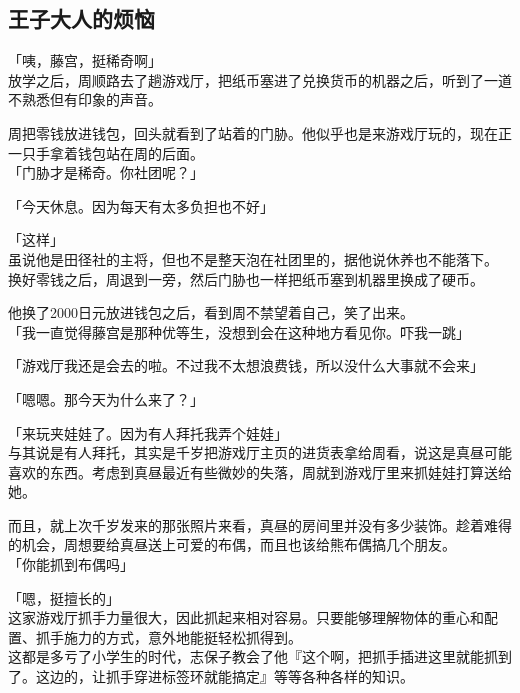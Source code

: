 \subsection{王子大人的烦恼}

「咦，藤宫，挺稀奇啊」\\

放学之后，周顺路去了趟游戏厅，把纸币塞进了兑换货币的机器之后，听到了一道不熟悉但有印象的声音。

周把零钱放进钱包，回头就看到了站着的门胁。他似乎也是来游戏厅玩的，现在正一只手拿着钱包站在周的后面。\\

「门胁才是稀奇。你社团呢？」

「今天休息。因为每天有太多负担也不好」

「这样」\\

虽说他是田径社的主将，但也不是整天泡在社团里的，据他说休养也不能落下。\\

换好零钱之后，周退到一旁，然后门胁也一样把纸币塞到机器里换成了硬币。

他换了2000日元放进钱包之后，看到周不禁望着自己，笑了出来。\\

「我一直觉得藤宫是那种优等生，没想到会在这种地方看见你。吓我一跳」

「游戏厅我还是会去的啦。不过我不太想浪费钱，所以没什么大事就不会来」

「嗯嗯。那今天为什么来了？」

「来玩夹娃娃了。因为有人拜托我弄个娃娃」\\

与其说是有人拜托，其实是千岁把游戏厅主页的进货表拿给周看，说这是真昼可能喜欢的东西。考虑到真昼最近有些微妙的失落，周就到游戏厅里来抓娃娃打算送给她。

而且，就上次千岁发来的那张照片来看，真昼的房间里并没有多少装饰。趁着难得的机会，周想要给真昼送上可爱的布偶，而且也该给熊布偶搞几个朋友。\\

「你能抓到布偶吗」

「嗯，挺擅长的」\\

这家游戏厅抓手力量很大，因此抓起来相对容易。只要能够理解物体的重心和配置、抓手施力的方式，意外地能挺轻松抓得到。\\

这都是多亏了小学生的时代，志保子教会了他『这个啊，把抓手插进这里就能抓到了。这边的，让抓手穿进标签环就能搞定』等等各种各样的知识。

